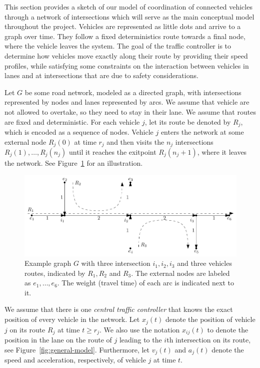 \documentclass{article}
\begin{document}
This section provides a sketch of our model of coordination of connected
vehicles through a network of intersections which will serve as the main
conceptual model throughout the project. Vehicles are represented as little dots
and arrive to a graph over time. They follow a fixed deterministics route
towards a final node, where the vehicle leaves the system. The goal of the
traffic controller is to determine how vehicles move exactly along their route
by providing their speed profiles, while satisfying some constraints on the
interaction between vehicles in lanes and at intersections that are due to
safety considerations.

Let $G$ be some road network, modeled as a directed graph, with intersections
represented by nodes and lanes represented by arcs. We assume that vehicle are
not allowed to overtake, so they need to stay in their lane.
%
We assume that routes are fixed and deterministic.
%
For each vehicle $j$, let its route be denoted by $R_{j}$, which is encoded as a
sequence of nodes. Vehicle $j$ enters the network at some external node
$R_{j}(0)$ at time $r_{j}$ and then visits the $n_{j}$ intersections
$R_{j}(1), \dots, R_{j}(n_{j})$ until it reaches the exitpoint
$R_{j}(n_{j} + 1)$, where it leaves the network.
 See Figure~\ref{fig:intersection-graph-example} for an
illustration.

\begin{figure}[t]
  \centering
  \includegraphics[width=1.0\textwidth]{figures/intersection-graph-example.pdf}
  \caption{Example graph $G$ with three intersection $i_{1}, i_{2}, i_{3}$ and three
    vehicles routes, indicated by $R_{1}, R_{2}$ and $R_{3}$.
    The external nodes are labeled as $e_{1}, \dots, e_{6}$. The weight
    (travel time) of each arc is indicated next to it.}
  \label{fig:intersection-graph-example}
\end{figure}


We assume that there is one \textit{central traffic controller} that knows the
exact position of every vehicle in the network. Let $x_{j}(t)$ denote the
position of vehicle $j$ on its route $R_{j}$ at time $t \geq r_{j}$. We also use
the notation $x_{ij}(t)$ to denote the position in the lane on the route of $j$
leading to the $i$th intersection on its route, see
Figure~\ref{fig:general-model}. Furthermore, let $v_{j}(t)$ and $a_{j}(t)$
denote the speed and acceleration, respectively, of vehicle $j$ at time $t$.
\end{document}
